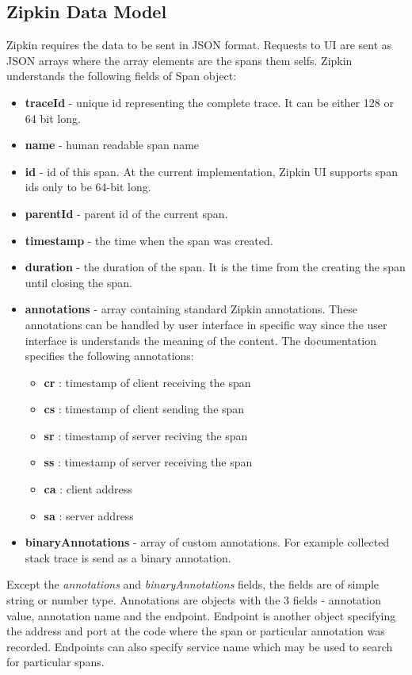 \subsection{Zipkin Data Model}
Zipkin requires the data to be sent in JSON format. Requests to UI are sent as JSON arrays where the array elements are the spans them selfs. Zipkin understands the following fields of Span object:
\begin{itemize}
	\item \textbf{traceId} - unique id representing the complete trace. It can be either 128 or 64 bit long.
	\item \textbf{name} - human readable span name
	\item \textbf{id} - id of this span. At the current implementation, Zipkin UI supports span ids only to be 64-bit long.
	\item \textbf{parentId} - parent id of the current span.
	\item \textbf{timestamp} - the time when the span was created.
	\item \textbf{duration} - the duration of the span. It is the time from the creating the span until closing the span.
	\item \textbf{annotations} - array containing standard Zipkin annotations. These annotations can be handled by user interface in specific way since the user interface is understands the meaning of the content. The documentation specifies the following annotations:
	\begin{itemize}
		\item \textbf{cr} : timestamp of client receiving the span
		\item \textbf{cs} : timestamp of client sending the span
		\item \textbf{sr} : timestamp of server reciving the span
		\item \textbf{ss} : timestamp of server receiving the span
		\item \textbf{ca} : client address
		\item \textbf{sa} : server address
	\end{itemize}
	\item \textbf{binaryAnnotations} - array of custom annotations. For example collected stack trace is send as a binary annotation.
\end{itemize}

Except the \textit{annotations} and \textit{binaryAnnotations} fields, the fields are of simple string or number type. Annotations are objects with the 3 fields - annotation value, annotation name and the endpoint. Endpoint is another object specifying the address and port at the code where the span or particular annotation was recorded. Endpoints can also specify service name which may be used to search for particular spans.

